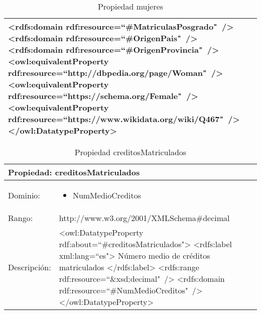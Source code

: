 \begin{table}[!ht]
\begin{tabular}{|p{}|p{}|}
		\tab\textless rdfs:domain\newline
		\tab\tab rdf:resource=``\#MatriculasPosgrado"\ /\textgreater\newline
		\tab\textless rdfs:domain\newline
		\tab\tab rdf:resource=``\#OrigenPais"\ /\textgreater\newline
		\tab\textless rdfs:domain\newline
		\tab\tab rdf:resource=``\#OrigenProvincia"\ /\textgreater\newline
		\tab\textless owl:equivalentProperty\newline
		\tab\tab rdf:resource=``http://dbpedia.org/page/Woman"\  /\textgreater\newline
		\tab\textless owl:equivalentProperty\newline
		\tab\tab rdf:resource=``https://schema.org/Female"\  /\textgreater\newline
		\tab\textless owl:equivalentProperty\newline
		\tab\tab rdf:resource=``https://www.wikidata.org/wiki/Q467"\  /\textgreater\newline
		\textless /owl:DatatypeProperty\textgreater
		\\ \hline
	\end{tabular}
	\caption{Propiedad mujeres}
	\label{propiedad-mujeres}
\end{table}

\begin{table}[!ht]
	\centering
	\begin{tabular}{|p{}|p{}|}
		\hline
		\multicolumn{2}{|l|}{Propiedad: \textbf{creditosMatriculados}}
		\\ \hline
		Dominio:&
		\begin{itemize}
			\item NumMedioCreditos
		\end{itemize}
		\\ \hline
		Rango:&
		http://www.w3.org/2001/XMLSchema\#decimal
		\\ \hline
		Descripción:&
		\textless owl:DatatypeProperty rdf:about=``\#creditosMatriculados"\textgreater\newline 
		\tab\textless rdfs:label xml:lang=``es"\textgreater\newline
		\tab\tab Número medio de créditos matriculados\newline
		\tab\textless /rdfs:label\textgreater\newline
		\tab\textless rdfs:range\newline
		\tab\tab rdf:resource=``\&xsd;decimal"\ /\textgreater\newline
		\tab\textless rdfs:domain\newline
		\tab\tab rdf:resource=``\#NumMedioCreditos"\ /\textgreater\newline
		\textless /owl:DatatypeProperty\textgreater
		\\ \hline
	\end{tabular}
	\caption{Propiedad creditosMatriculados}
	\label{propiedad-creditosmatriculados}
\end{table}

